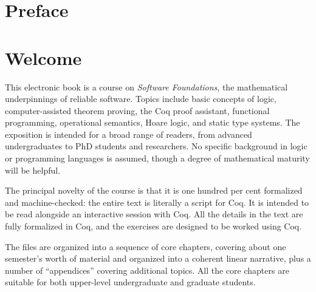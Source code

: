 \documentclass[12pt]{report}
\begin{document}
\tableofcontents
{}

\begin{coqdoccode}
\end{coqdoccode}
\section{Preface}

\begin{coqdoccode}
\coqdocemptyline
\end{coqdoccode}
\section{Welcome}



 This electronic book is a course on \textit{Software Foundations}, the
    mathematical underpinnings of reliable software.  Topics include
    basic concepts of logic, computer-assisted theorem proving, the
    Coq proof assistant, functional programming, operational
    semantics, Hoare logic, and static type systems.  The exposition
    is intended for a broad range of readers, from advanced
    undergraduates to PhD students and researchers.  No specific
    background in logic or programming languages is assumed, though a
    degree of mathematical maturity will be helpful.


    The principal novelty of the course is that it is one hundred per
    cent formalized and machine-checked: the entire text is literally
    a script for Coq.  It is intended to be read alongside an
    interactive session with Coq.  All the details in the text are
    fully formalized in Coq, and the exercises are designed to be
    worked using Coq.


    The files are organized into a sequence of core chapters, covering
    about one semester's worth of material and organized into a
    coherent linear narrative, plus a number of ``appendices'' covering
    additional topics.  All the core chapters are suitable for both
    upper-level undergraduate and graduate students. \begin{coqdoccode}
\coqdocemptyline
\end{coqdoccode}
\end{document}
